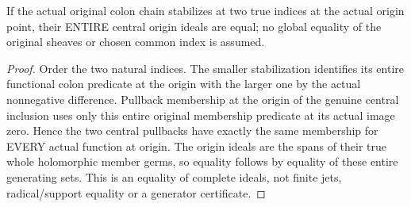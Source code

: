 \begin{lemma}
\label{hir:relative-normal-affine-dnc-stable-index}
\leanok
If the actual original colon chain stabilizes at two true indices at the actual origin point, their ENTIRE central origin ideals are equal; no global equality of the original sheaves or chosen common index is assumed.
\end{lemma}
\begin{proof}
Order the two natural indices. The smaller stabilization identifies its entire functional colon predicate at the origin with the larger one by the actual nonnegative difference. Pullback membership at the origin of the genuine central inclusion uses only this entire original membership predicate at its actual image zero. Hence the two central pullbacks have exactly the same membership for EVERY actual function at origin. The origin ideals are the spans of their true whole holomorphic member germs, so equality follows by equality of these entire generating sets. This is an equality of complete ideals, not finite jets, radical/support equality or a generator certificate.
\end{proof}

